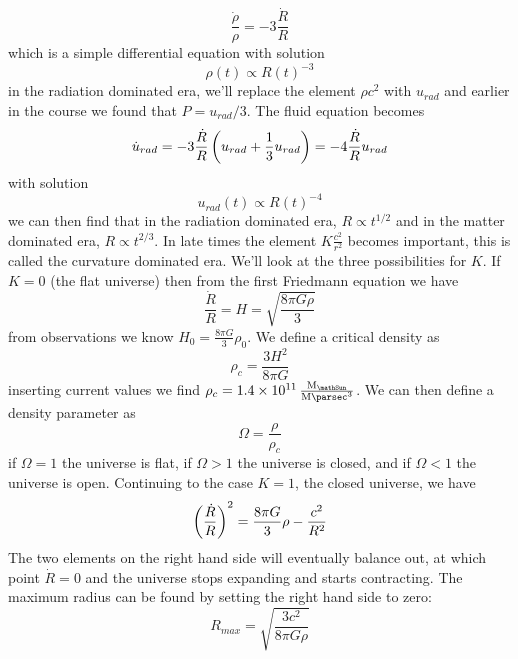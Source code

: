 \begin{equation}
    \frac{\dot{\rho}}{\rho} = -3\frac{\dot{R}}{R}
\end{equation}
which is a simple differential equation with solution
\begin{equation}
    \rho(t) \propto R(t)^{-3}
\end{equation}
in the radiation dominated era, we'll replace the element \(\rho c^2\) with \(u_{rad}\) and earlier in the course we found that \(P = u_{rad}/3\). The fluid equation becomes
\begin{equation}
    \dot{u}_{rad} = -3\frac{\dot{R}}{R} \left(u_{rad}+\frac{1}{3}u_{rad}\right) = -4\frac{\dot{R}}{R}u_{rad}
\end{equation}
with solution
\begin{equation}
    u_{rad}(t) \propto R(t)^{-4}
\end{equation}
we can then find that in the radiation dominated era, \(R \propto t^{1/2}\) and in the matter dominated era, \(R \propto t^{2/3}\). In late times the element \(K\frac{c^2}{r^2}\) becomes important, this is called the curvature dominated era. We'll look at the three possibilities for \(K\). If \(K=0\) (the flat universe) then from the first Friedmann equation we have
\begin{equation}
    \frac{\dot{R}}{R} = H = \sqrt{\frac{8\pi G \rho}{3}}
\end{equation}
from observations we know \(H_0 = \frac{8\pi G}{3}\rho_0\). We define a critical density as
\begin{equation}
    \rho_c = \frac{3H^2}{8\pi G}
\end{equation}
inserting current values we find \(\rho_c = \qty{1.4e11}{\frac{M_\mathSun}{\mega\parsec^3}}\). We can then define a density parameter as
\begin{equation}
    \Omega = \frac{\rho}{\rho_c}
\end{equation}
if \(\Omega = 1\) the universe is flat, if \(\Omega > 1\) the universe is closed, and if \(\Omega < 1\) the universe is open. Continuing to the case \(K=1\), the closed universe, we have
\begin{equation}
    \left(\frac{\dot{R}}{R}\right)^2 = \frac{8\pi G}{3}\rho - \frac{c^2}{R^2}
\end{equation}
The two elements on the right hand side will eventually balance out, at which point \(\dot{R} = 0\) and the universe stops expanding and starts contracting. The maximum radius can be found by setting the right hand side to zero:
\begin{equation}
    R_{max} = \sqrt{\frac{3c^2}{8\pi G \rho}}
\end{equation}
